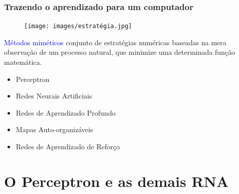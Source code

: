 \documentclass[aspectratio=169]{beamer} %
\begin{document}
\begin{frame}
	\frametitle{Trazendo o aprendizado para um computador}
	\begin{figure}
		\centering
		\texttt{[image: images/estratégia.jpg]} %
	\end{figure}	

	\pause

	\begin{minipage}{0.5\textwidth}
		\begin{tcolorbox}[colback=gray!5,colframe=blue!40!black,title=Estratégia 2]
			\justifying
			\textcolor{blue}{Métodos miméticos} conjunto de estratégias numéricas baseadas na mera observação de um processo natural, que minimize uma determinada função matemática.  
		\end{tcolorbox}
    \end{minipage}%
		\pause
    \begin{minipage}{0.5\textwidth}
        \begin{itemize}
			\item Perceptron
			\item Redes Neurais Artificiais
			\item Redes de Aprendizado Profundo
			\item Mapas Auto-organizáveis
			\item Redes de Aprendizado de Reforço
		   \end{itemize}
    \end{minipage}
\end{frame}


\section{O Perceptron e as demais RNA}
\end{document}

